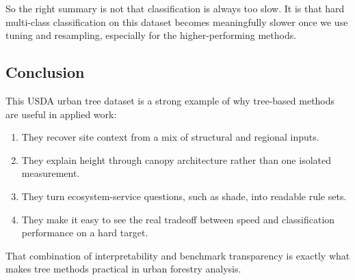 \documentclass[
  11pt,
]{article}
\providecommand{\tightlist}{%
  \setlength{\itemsep}{0pt}\setlength{\parskip}{0pt}}
\begin{document}
So the right summary is not that classification is always too slow. It
is that hard multi-class classification on this dataset becomes
meaningfully slower once we use tuning and resampling, especially for
the higher-performing methods.

\subsection{Conclusion}\label{conclusion}

This USDA urban tree dataset is a strong example of why tree-based
methods are useful in applied work:

\begin{enumerate}
\def\labelenumi{\arabic{enumi}.}
\tightlist
\item
  They recover site context from a mix of structural and regional
  inputs.
\item
  They explain height through canopy architecture rather than one
  isolated measurement.
\item
  They turn ecosystem-service questions, such as shade, into readable
  rule sets.
\item
  They make it easy to see the real tradeoff between speed and
  classification performance on a hard target.
\end{enumerate}

That combination of interpretability and benchmark transparency is
exactly what makes tree methods practical in urban forestry analysis.
\end{document}
